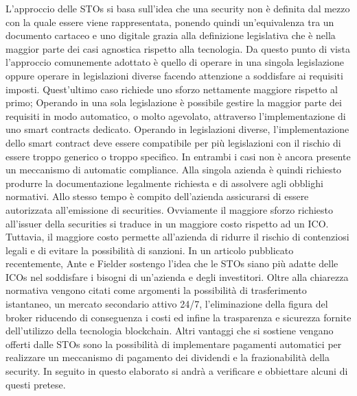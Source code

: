 L'approccio delle STOs si basa sull'idea che una security non è definita dal mezzo con la quale essere viene rappresentata, ponendo quindi un'equivalenza tra un documento cartaceo e uno digitale grazia alla definizione legislativa che è nella maggior parte dei casi agnostica rispetto alla tecnologia.  Da questo punto di vista l'approccio comunemente adottato è quello di operare in una singola legislazione oppure operare in legislazioni diverse facendo attenzione a soddisfare ai requisiti imposti. Quest'ultimo caso richiede uno sforzo nettamente maggiore rispetto al primo; Operando in una sola legislazione è possibile gestire la maggior parte dei requisiti in modo automatico, o molto agevolato, attraverso l'implementazione di uno smart contracts dedicato. Operando in legislazioni diverse, l'implementazione dello smart contract deve essere compatibile per più legislazioni con il rischio di essere troppo generico o troppo specifico. In entrambi i casi non è ancora presente un meccanismo di automatic compliance. Alla singola azienda è quindi richiesto produrre la documentazione legalmente richiesta e di assolvere agli obblighi normativi. Allo stesso tempo è compito dell'azienda assicurarsi di essere autorizzata all'emissione di securities. Ovviamente il maggiore sforzo richiesto all'issuer della securities si traduce in un maggiore costo rispetto ad un ICO. Tuttavia, il maggiore costo permette all'azienda di ridurre il rischio di contenziosi legali e di evitare la possibilità di sanzioni. 
In un articolo pubblicato recentemente, Ante e Fielder\cite{K35} sostengo l'idea che le STOs siano più adatte delle ICOs nel soddisfare i bisogni di un'azienda e degli investitori. Oltre alla chiarezza normativa vengono citati come argomenti la possibilità di trasferimento istantaneo, un mercato secondario attivo 24/7, l'eliminazione della figura del broker riducendo di conseguenza i costi ed infine la trasparenza e sicurezza fornite dell'utilizzo della tecnologia blockchain.\cite{K30} Altri vantaggi che si sostiene vengano offerti dalle STOs sono la possibilità di implementare pagamenti automatici per realizzare un meccanismo di pagamento dei dividendi e la  frazionabilità della security\cite{K36}. In seguito in questo elaborato si andrà a verificare e obbiettare alcuni di questi pretese.  

